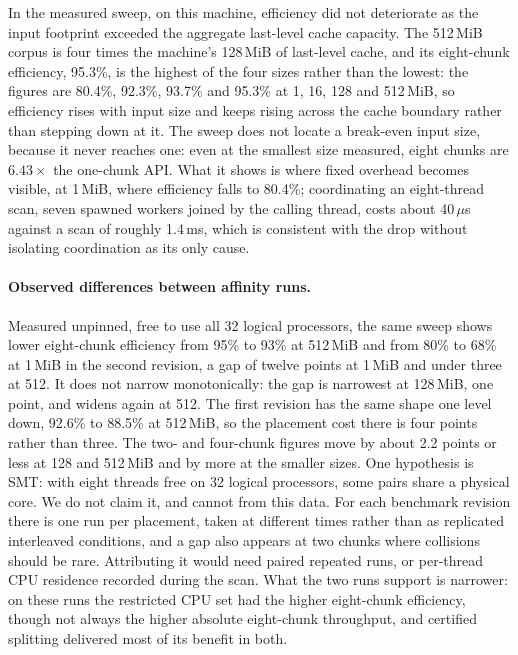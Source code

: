 \documentclass[11pt,a4paper]{article}
\theoremstyle{definition}
\theoremstyle{plain}
\begin{document}
In the measured sweep, on this machine, efficiency did not deteriorate as the input footprint exceeded the aggregate
last-level cache capacity. The 512\,MiB corpus is four times the machine's 128\,MiB of last-level cache, and its
eight-chunk efficiency, 95.3\%, is the highest of the four sizes rather than the lowest: the figures are 80.4\%,
92.3\%, 93.7\% and 95.3\% at 1, 16, 128 and 512\,MiB, so efficiency rises with input size and keeps rising across the
cache boundary rather than stepping down at it. The sweep does not locate a break-even input size, because it never
reaches one: even at the smallest size measured, eight chunks are $6.43\times$ the one-chunk API. What it shows is
where fixed overhead becomes visible, at 1\,MiB, where efficiency falls to 80.4\%; coordinating an eight-thread scan,
seven spawned workers joined by the calling thread, costs about 40\,$\mu$s against a scan of roughly 1.4\,ms, which is
consistent with the drop without isolating coordination as its only cause.

\paragraph{Observed differences between affinity runs.} Measured unpinned, free to use all 32 logical processors, the
same sweep shows lower eight-chunk efficiency from 95\% to 93\% at 512\,MiB and from 80\% to 68\% at 1\,MiB in the
second revision, a gap of twelve points at 1\,MiB and under three at 512. It does not narrow monotonically: the gap is
narrowest at 128\,MiB, one point, and widens again at 512. The first revision has the same shape one level down,
92.6\% to 88.5\% at 512\,MiB, so the placement cost there is four points rather than three. The two- and four-chunk
figures move by about 2.2 points or less at 128 and 512\,MiB and by more at the smaller sizes. One hypothesis is SMT:
with eight threads free on 32 logical processors, some pairs share a physical core. We do not claim it, and cannot
from this data. For each benchmark revision there is one run per placement, taken at different times rather than as
replicated interleaved conditions, and a gap also appears at two chunks where collisions should be rare. Attributing
it would need paired repeated runs, or per-thread CPU residence recorded during the scan. What the two runs support is
narrower: on these runs the restricted CPU set had the higher eight-chunk efficiency, though not always the higher
absolute eight-chunk throughput, and certified splitting delivered most of its benefit in both.
\end{document}
